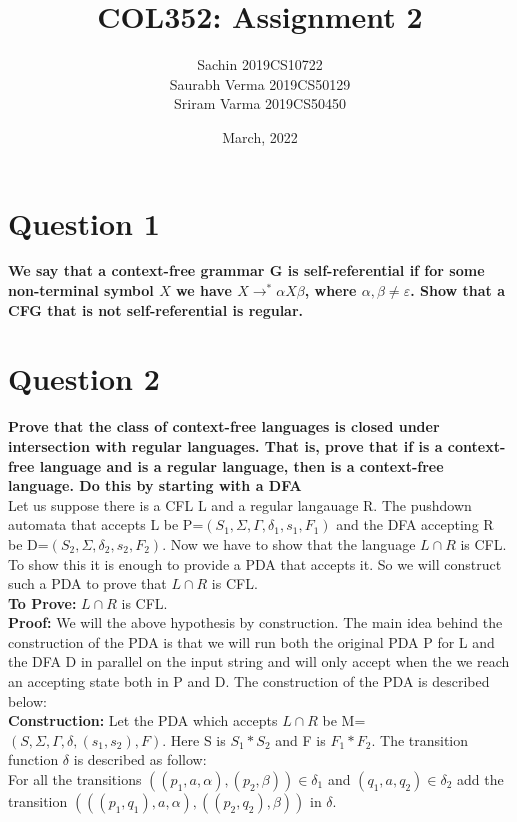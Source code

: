 \documentclass{article}
\title{COL352: Assignment 2}
\author{Sachin 2019CS10722 \\
        Saurabh Verma 2019CS50129\\
        Sriram Varma 2019CS50450}
\date{March, 2022}
\begin{document}
\maketitle


\section{Question 1}
\textbf{We say that a context-free grammar G is self-referential if for some non-terminal symbol $X$ we have $X \to^* \alpha X \beta$, where $\alpha, \beta \neq \varepsilon$. Show that a CFG that is not self-referential is regular.}



\pagebreak


\section{Question 2}
\textbf{Prove that the class of context-free languages is closed under intersection with regular languages. That is, prove that if  is a context-free language and  is a regular language, then 
is a context-free language. Do this by starting with a DFA}\\
\newline
Let us suppose there is a CFL L and a regular langauage R. The pushdown automata that accepts L be P=$(S_1,\Sigma,\Gamma,\delta_1,s_1,F_1)$ and the DFA accepting R be D=$(S_2,\Sigma,\delta_2,s_2,F_2)$. Now we have to show that the language $L\cap R$ is CFL. To show this it is enough to provide a PDA that accepts it. So we will construct such a PDA to prove that  $L\cap R$ is CFL. \\
\textbf{To Prove:} $L\cap R$ is CFL. \\
\textbf{Proof:} We will the above hypothesis by construction. The main idea behind the construction of the PDA is that we will run both the original PDA P for L and the DFA D in parallel on the input string and will only accept when the we reach an accepting state both in P and D. The construction of the PDA is described below:\\
\textbf{Construction:} Let the PDA which accepts $L\cap R$ be M=$(S,\Sigma,\Gamma,\delta,(s_1,s_2),F)$. Here S is $S_1 * S_2$ and F is $F_1 *F_2$. The transition function $\delta$ is described as follow: \\
For all the transitions $((p_1,a,\alpha),(p_2,\beta)) \in \delta_1$  and $(q_1,a,q_2) \in \delta_2$ add the transition $(((p_1,q_1),a,\alpha),((p_2,q_2),\beta))$ in $\delta$.\\
\end{document}
